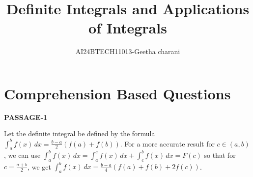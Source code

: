 \documentclass[journal,12pt,twocolumn]{IEEEtran}
\theoremstyle{remark}
\begin{document}

\vspace{3cm}

\title{Definite Integrals and Applications of Integrals}
\author{AI24BTECH11013-Geetha charani}
\maketitle
\newpage
\bigskip

\renewcommand{\thefigure}{\theenumi}
\renewcommand{\thetable}{\theenumi}
\section{Comprehension Based Questions}
\textbf{PASSAGE-1}

Let the definite integral be defined by the formula
$\int_a^b f(x) \, dx = \frac{b-a}{2} ( f(a) + f(b) ).$
For a more accurate result for \( c \in (a, b) \), we can use
$\int_a^b f(x) \, dx = \int_a^c f(x) \, dx + \int_c^b f(x) \, dx = F(c)$
so that for \( c = \frac{a+b}{2} \), we get
$\int_a^b f(x) \, dx = \frac{b-a}{4}( f(a) + f(b) + 2f(c) )$.
\end{document}
